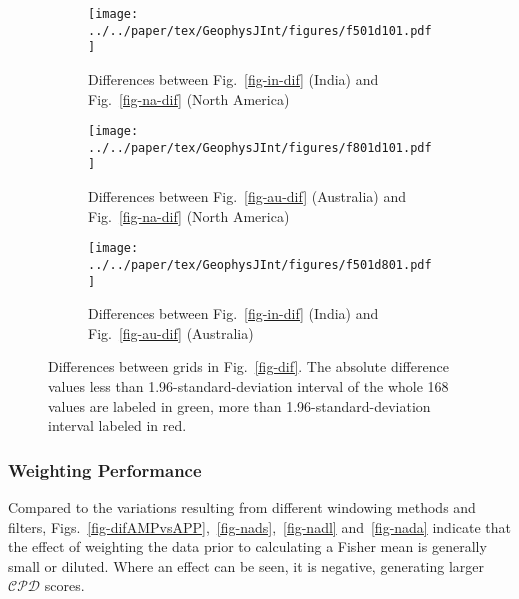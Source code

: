 \begin{figure*}
	\centering
	\begin{subfigure}{1.01\textwidth}
		\texttt{[image: ../../paper/tex/GeophysJInt/figures/f501d101.pdf]}
		\caption{Differences between Fig.~\ref{fig-in-dif} (India) and
		Fig.~\ref{fig-na-dif} (North America)}\label{fig-i-n-dif}
	\end{subfigure}
	\vspace{.1em}
	\begin{subfigure}{1.01\textwidth}
		\texttt{[image: ../../paper/tex/GeophysJInt/figures/f801d101.pdf]}
		\caption{Differences between Fig.~\ref{fig-au-dif} (Australia) and
		Fig.~\ref{fig-na-dif} (North America)}\label{fig-a-n-dif}
	\end{subfigure}
	\vspace{.1em}
	\begin{subfigure}{1.01\textwidth}
		\texttt{[image: ../../paper/tex/GeophysJInt/figures/f501d801.pdf]}
		\caption{Differences between Fig.~\ref{fig-in-dif} (India) and
		Fig.~\ref{fig-au-dif} (Australia)}\label{fig-i-a-dif}
	\end{subfigure}
	\caption[Differences of $\mathcal{CPD}$ of each plate's paleomagnetic
APWPs vs its FHM predicted APWP]{Differences between grids in
Fig.~\ref{fig-dif}. The absolute difference values less than
1.96-standard-deviation interval of the whole 168 values are labeled in green,
more than 1.96-standard-deviation interval labeled in red.}\label{fig-d-dif}
\end{figure*}

\subsubsection{Weighting Performance}

Compared to the variations resulting from different windowing methods and
filters, Figs.~\ref{fig-difAMPvsAPP},~\ref{fig-nads},~\ref{fig-nadl}
and~\ref{fig-nada} indicate that the effect of weighting the data prior to
calculating a Fisher mean is generally small or diluted. Where an effect can be
seen, it is negative, generating larger $\mathcal{CPD}$ scores.

